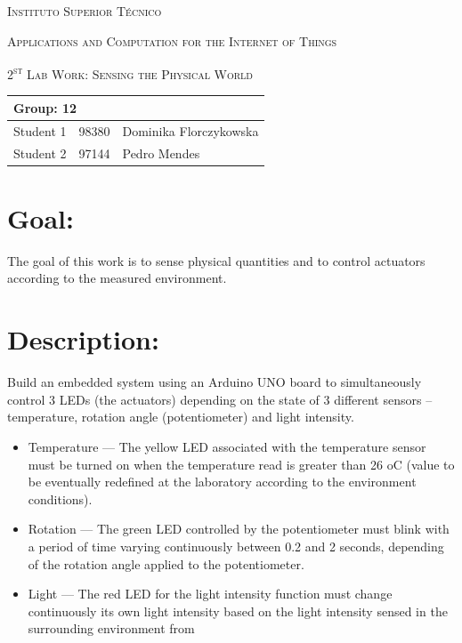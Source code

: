 \documentclass[10pt]{article}
\begin{document}
\begin{center}
    {\scshape Instituto Superior Técnico\par}
    \vspace{1cm}
    {\scshape\Large Applications and Computation for the Internet of Things\par}
    \vspace{1.5cm}
\end{center}
{\scshape\LARGE 2\textsuperscript{st} Lab Work: Sensing the Physical World}
\\
\begin{table}[h!]
    \centering
    \begin{tabular}{|l|l|p{10cm}|}
        \hline
        \multicolumn{3}{|l|}{Group: 12} \\[1.5ex] \hline
        Student 1 & 98380 & Dominika Florczykowska \\ [1.5ex]\hline
        Student 2 & 97144 & Pedro Mendes \\ [1.5ex]\hline
    \end{tabular}
\end{table}

\section{Goal:}
The goal of this work is to sense physical quantities and to control actuators
according to the measured environment.

\section{Description:}
Build an embedded system using an Arduino UNO board to simultaneously control 3
LEDs (the actuators) depending on the state of 3 different sensors –
temperature, rotation angle (potentiometer) and light intensity.

\begin{itemize}
    \item Temperature --- The yellow LED associated with the temperature sensor
        must be turned on when the temperature read is greater than 26 oC (value
        to be eventually redefined at the laboratory according to the
        environment conditions).
    \item Rotation --- The green LED controlled by the potentiometer must blink
        with a period of time varying continuously between 0.2 and 2 seconds,
        depending of the rotation angle applied to the potentiometer.
    \item Light --- The red LED for the light intensity function must change
        continuously its own light intensity based on the light intensity sensed
        in the surrounding environment from
\end{itemize}
\end{document}

